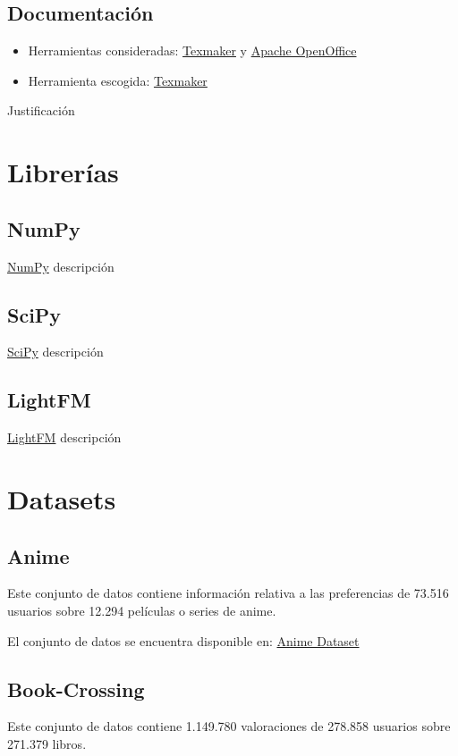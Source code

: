 \subsection{Documentación}\label{documentacion}
\begin{itemize}
\tightlist
\item Herramientas consideradas: 
	\href{http://www.xm1math.net/texmaker/}{Texmaker} y
	\href{https://www.openoffice.org/es/}{Apache OpenOffice}
\item Herramienta escogida:
	\href{http://www.xm1math.net/texmaker/}{Texmaker}
\end{itemize}
Justificación

\section{Librerías}\label{librerias}
\subsection{NumPy}\label{numpy}
\href{http://www.numpy.org/}{NumPy} descripción

\subsection{SciPy}\label{scipy}
\href{https://www.scipy.org/scipylib/index.html}{SciPy} descripción

\subsection{LightFM}\label{lightfm}
\href{https://github.com/lyst/lightfm}{LightFM} descripción

\section{Datasets}\label{datasets}
\subsection{Anime}\label{anime}
Este conjunto de datos \cite{CopperUnion2017} contiene información relativa a las preferencias de 73.516 usuarios sobre 12.294 películas o series de anime.

El conjunto de datos se encuentra disponible en: \href{https://www.kaggle.com/CooperUnion/anime-recommendations-database/downloads/anime-recommendations-database.zip/1}{Anime Dataset}

\subsection{Book-Crossing}\label{book-crossing}
Este conjunto de datos \cite{Ziegler2004} contiene 1.149.780 valoraciones de 278.858 usuarios sobre 271.379 libros.

